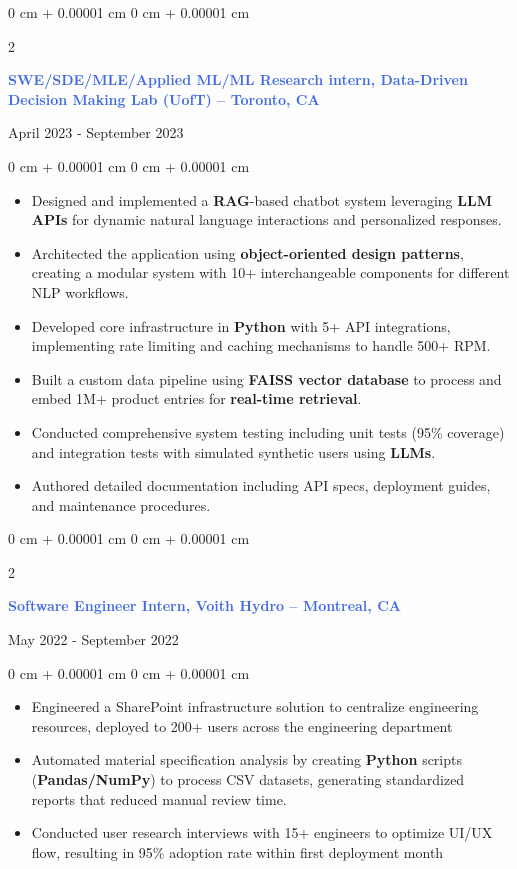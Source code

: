 \documentclass[10pt, letterpaper]{article}
\newenvironment{highlights}{
    \begin{itemize}[
        topsep=0.10 cm,
        parsep=0.10 cm,
        partopsep=0pt,
        itemsep=0pt,
        leftmargin=0 cm + 10pt
    ]
}{
    \end{itemize}
}
\newenvironment{onecolentry}{
    \begin{adjustwidth}{
        0 cm + 0.00001 cm
    }{
        0 cm + 0.00001 cm
    }
}{
    \end{adjustwidth}
}
\newenvironment{twocolentry}[2][]{
    \onecolentry
    \def\secondColumn{#2}
    \setcolumnwidth{\fill, 4.5 cm}
    \begin{paracol}{2}
}{
    \switchcolumn \raggedleft \secondColumn
    \end{paracol}
    \endonecolentry
}
\begin{document}
\vspace{0.25 cm}
\begin{twocolentry}{April 2023 - September 2023}
 \textcolor{royalblue}{\textbf{SWE/SDE/MLE/Applied ML/ML Research intern, Data-Driven Decision Making Lab (UofT) -- Toronto, CA}}
\end{twocolentry}
\begin{onecolentry}
    \begin{highlights}
        \item Designed and implemented a \textbf{RAG}-based chatbot system leveraging \textbf{LLM APIs} for dynamic natural language interactions and personalized responses.
        \item Architected the application using \textbf{object-oriented design patterns}, creating a modular system with 10+ interchangeable components for different NLP workflows.
        \item Developed core infrastructure in \textbf{Python} with 5+ API integrations, implementing rate limiting and caching mechanisms to handle 500+ RPM.
        \item Built a custom data pipeline using \textbf{FAISS vector database} to process and embed 1M+ product entries for \textbf{real-time retrieval}.
        \item Conducted comprehensive system testing including unit tests (95\% coverage) and integration tests with simulated synthetic users using \textbf{LLMs}.
        \item Authored detailed documentation including API specs, deployment guides, and maintenance procedures.
    \end{highlights}
\end{onecolentry}

\vspace{0.25 cm}
\begin{twocolentry}{May 2022 - September 2022}
    \textcolor{royalblue}{\textbf{Software Engineer Intern, Voith Hydro -- Montreal, CA}}
\end{twocolentry}
\begin{onecolentry}
    \begin{highlights}
        \item Engineered a SharePoint infrastructure solution to centralize engineering resources, deployed to 200+ users across the engineering department
        \item Automated material specification analysis by creating \textbf{Python} scripts (\textbf{Pandas/NumPy}) to process CSV datasets, generating standardized reports that reduced manual review time.
        \item Conducted user research interviews with 15+ engineers to optimize UI/UX flow, resulting in 95\% adoption rate within first deployment month
    \end{highlights}
\end{onecolentry}
\end{document}
